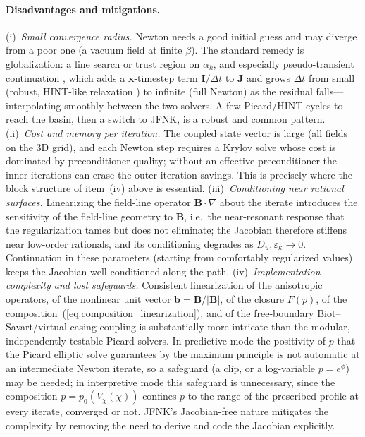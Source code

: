 \documentclass[english]{article}
\newcommand{\bB}{\mathbf{B}}
\newcommand{\bb}{\mathbf{b}}
\begin{document}
\paragraph{Disadvantages and mitigations.}
(i)~\emph{Small convergence radius.} Newton needs a good initial guess and may diverge from a poor
one (a vacuum field at finite $\beta$). The standard remedy is globalization: a line search or trust
region on $\alpha_k$, and especially pseudo-transient continuation \cite{kelley1998}, which adds a
$\mathbf{x}$-timestep term $\mathbf{I}/\Delta t$ to $\mathbf{J}$ and grows $\Delta t$ from small
(robust, HINT-like relaxation \cite{harafuji1989,suzuki2006}) to infinite (full Newton) as the
residual falls---interpolating smoothly between the two solvers. A few Picard/HINT cycles to reach
the basin, then a switch to JFNK, is a robust and common pattern. (ii)~\emph{Cost and memory per
iteration.} The coupled state vector is large (all fields on the 3D grid), and each Newton step
requires a Krylov solve whose cost is dominated by preconditioner quality; without an effective
preconditioner the inner iterations can erase the outer-iteration savings. This is precisely where
the block structure of item~(iv) above is essential. (iii)~\emph{Conditioning near rational
surfaces.} Linearizing the field-line operator $\bB\cdot\nabla$ about the iterate introduces the
sensitivity of the field-line geometry to $\bB$, i.e.\ the near-resonant response that the
regularization tames but does not eliminate; the Jacobian therefore stiffens near low-order
rationals, and its conditioning degrades as $D_u,\varepsilon_\kappa\to0$. Continuation in these
parameters (starting from comfortably regularized values) keeps the Jacobian well conditioned along
the path. (iv)~\emph{Implementation complexity and lost safeguards.} Consistent linearization of the
anisotropic operators, of the nonlinear unit vector $\bb=\bB/|\bB|$, of the closure $F(p)$, of the
composition~(\ref{eq:composition_linearization}), and of
the free-boundary Biot--Savart/virtual-casing coupling \cite{hanson2015} is substantially more
intricate than the modular, independently testable Picard solvers. In predictive mode the
positivity of $p$ that the Picard elliptic solve guarantees by the maximum principle is not
automatic at an intermediate Newton iterate, so a safeguard (a clip, or a log-variable
$p=e^{\phi}$) may be needed; in interpretive mode this safeguard is unnecessary, since the
composition $p=p_0(V_\chi(\chi))$ confines $p$ to the range of the prescribed profile at every
iterate, converged or not. JFNK's Jacobian-free nature mitigates the complexity by removing
the need to derive and code the Jacobian explicitly.
\end{document}

